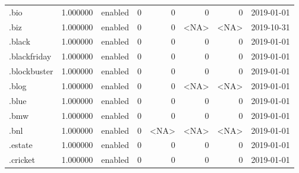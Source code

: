 \begin{tabular}{lrlrrrrl}
.bio                      &          1.000000 &         enabled &                           0 &                           0 &                           0 &                   0 &           2019-01-01 \\
.biz                      &          1.000000 &         enabled &                           0 &                           0 &                        <NA> &                <NA> &           2019-10-31 \\
.black                    &          1.000000 &         enabled &                           0 &                           0 &                           0 &                   0 &           2019-01-01 \\
.blackfriday              &          1.000000 &         enabled &                           0 &                           0 &                           0 &                   0 &           2019-01-01 \\
.blockbuster              &          1.000000 &         enabled &                           0 &                           0 &                           0 &                   0 &           2019-01-01 \\
.blog                     &          1.000000 &         enabled &                           0 &                           0 &                        <NA> &                <NA> &           2019-01-01 \\
.blue                     &          1.000000 &         enabled &                           0 &                           0 &                           0 &                   0 &           2019-01-01 \\
.bmw                      &          1.000000 &         enabled &                           0 &                           0 &                           0 &                   0 &           2019-01-01 \\
.bnl                      &          1.000000 &         enabled &                           0 &                        <NA> &                        <NA> &                <NA> &           2019-01-01 \\
.estate                   &          1.000000 &         enabled &                           0 &                           0 &                           0 &                   0 &           2019-01-01 \\
.cricket                  &          1.000000 &         enabled &                           0 &                           0 &                           0 &                   0 &           2019-01-01 \\

\end{tabular}
